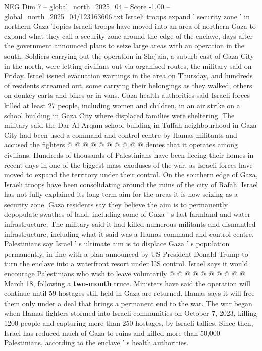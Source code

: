 \begin{textsample}{NEG Dim 7 – global\_north\_2025\_04 – Score -1.00 – global\_north\_2025\_04/123163606.txt}  \label{ex:f7_neg_097}
Israeli troops expand ' security zone ' in northern Gaza Topics Israeli troops have moved into an area of northern Gaza to expand what they call a security zone around the edge of the enclave, days after the government announced plans to seize large areas with an operation in the south.
Soldiers carrying out the operation in Shejaia, a suburb east of Gaza City in the north, were letting civilians out via organised routes, the military said on Friday.
Israel issued evacuation warnings in the area on Thursday, and hundreds of residents streamed out, some carrying their belongings as they walked, others on donkey carts and bikes or in vans.
Gaza health authorities said Israeli forces killed at least 27 people, including women and children, in an air strike on a school building in Gaza City where displaced families were sheltering.
The military said the Dar Al-Arqam school building in Tuffah neighbourhood in Gaza City had been used a command and control centre by Hamas militants and accused the fighters @ @ @ @ @ @ @ @ @ @ denies that it operates among civilians.
Hundreds of thousands of Palestinians have been fleeing their homes in recent days in one of the biggest mass exoduses of the war, as Israeli forces have moved to expand the territory under their control.
On the southern edge of Gaza, Israeli troops have been consolidating around the ruins of the city of Rafah.
Israel has not fully explained its long-term aim for the areas it is now seizing as a security zone.
Gaza residents say they believe the aim is to permanently depopulate swathes of land, including some of Gaza ' s last farmland and water infrastructure.
The military said it had killed numerous militants and dismantled infrastructure, including what it said was a Hamas command and control centre.
Palestinians say Israel ' s ultimate aim is to displace Gaza ' s population permanently, in line with a plan announced by US President Donald Trump to turn the enclave into a waterfront resort under US control.
Israel says it would encourage Palestinians who wish to leave voluntarily @ @ @ @ @ @ @ @ @ @ March 18, following a \textbf{two-month} truce.
Ministers have said the operation will continue until 59 hostages still held in Gaza are returned.
Hamas says it will free them only under a deal that brings a permanent end to the war.
The war began when Hamas fighters stormed into Israeli communities on October 7, 2023, killing 1200 people and capturing more than 250 hostages, by Israeli tallies.
Since then, Israel has reduced much of Gaza to ruins and killed more than 50,000 Palestinians, according to the enclave ' s health authorities.

\end{textsample}
